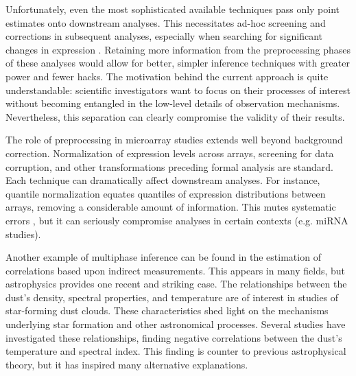 Unfortunately, even the most sophisticated available techniques pass only point estimates onto downstream analyses.
This necessitates ad-hoc screening and corrections in subsequent analyses, especially when searching for significant changes in expression \citep[e.g.][]{Tusher2001}.
Retaining more information from the preprocessing phases of these analyses would allow for better, simpler inference techniques with greater power and fewer hacks.
The motivation behind the current approach is quite understandable: scientific investigators want to focus on their processes of interest without becoming entangled in the low-level details of observation mechanisms.
Nevertheless, this separation can clearly compromise the validity of their results.

The role of preprocessing in microarray studies extends well beyond background correction.
Normalization of expression levels across arrays, screening for data corruption, and other transformations preceding formal analysis are standard.
Each technique can dramatically affect downstream analyses.
For instance, quantile normalization equates quantiles of expression distributions between arrays, removing a considerable amount of information.
This mutes systematic errors \citep{Bolstad2003}, but it can seriously compromise analyses in certain contexts (e.g. miRNA studies).

Another example of multiphase inference can be found in the estimation of correlations based upon indirect measurements.
This appears in many fields, but astrophysics provides one recent and striking case.
The relationships between the dust's density, spectral properties, and temperature are of interest in studies of star-forming dust clouds.
These characteristics shed light on the mechanisms underlying star formation and other astronomical processes.
Several studies \citep[e.g.][]{Dupac2003,Desert2008,Anderson2010,Paradis2010} have investigated these relationships, finding negative correlations between the dust's temperature and spectral index.
This finding is counter to previous astrophysical theory, but it has inspired many alternative explanations.

